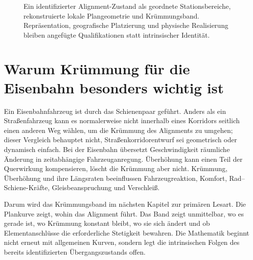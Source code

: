\begin{figure}[htbp]
  \centering
  \resizebox{\textwidth}{!}{}
  \caption{Ein identifizierter Alignment-Zustand als geordnete
  Stationsbereiche, rekonstruierte lokale Plangeometrie und Krümmungsband.
  Repräsentation, geografische Platzierung und physische Realisierung bleiben
  angefügte Qualifikationen statt intrinsischer Identität.}
  \label{fig:alignment-object-stationing-curvature}
\end{figure}

\section*{Warum Krümmung für die Eisenbahn besonders wichtig ist}

Ein Eisenbahnfahrzeug ist durch das Schienenpaar geführt. Anders als ein
Straßenfahrzeug kann es normalerweise nicht innerhalb eines Korridors seitlich
einen anderen Weg wählen, um die Krümmung des Alignments zu umgehen; dieser
Vergleich behauptet nicht, Straßenkorridorentwurf sei geometrisch oder
dynamisch einfach. Bei der Eisenbahn übersetzt Geschwindigkeit räumliche
Änderung in zeitabhängige Fahrzeuganregung. Überhöhung kann einen Teil der
Querwirkung kompensieren, löscht die Krümmung aber nicht. Krümmung, Überhöhung
und ihre Längsraten beeinflussen Fahrzeugreaktion, Komfort,
Rad--Schiene-Kräfte, Gleisbeanspruchung und Verschleiß.

Darum wird das Krümmungsband im nächsten Kapitel zur primären Lesart. Die
Plankurve zeigt, wohin das Alignment führt. Das Band zeigt unmittelbar, wo es
gerade ist, wo Krümmung konstant bleibt, wo sie sich ändert und ob
Elementanschlüsse die erforderliche Stetigkeit bewahren. Die Mathematik beginnt
nicht erneut mit allgemeinen Kurven, sondern legt die intrinsischen Folgen des
bereits identifizierten Übergangszustands offen.
